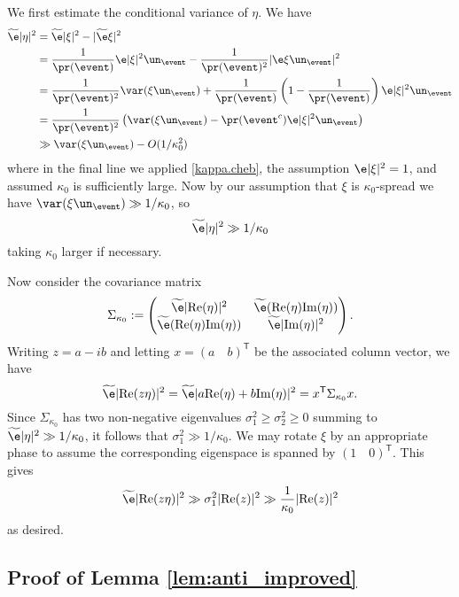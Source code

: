 \documentclass[aop,preprint]{imsart}
\theoremstyle{plain}
\theoremstyle{definition}
\theoremstyle{remark}
\numberwithin{equation}{section}
\numberwithin{theorem}{section}
\def \re {\mathrm{Re}}
\def \im {\mathrm{Im}}
\def \tran {\mathsf{T}}
\begin{document}
We first estimate the conditional variance of $\eta$. 
We have
\begin{align*}
\widetilde{\e}|\eta|^2 
& = \widetilde{\e}|\xi|^2 - |\widetilde{\e}\xi|^2 \\
&= \frac1{\pr(\event)} \e |\xi|^2 \un_{\event} - \frac1{\pr(\event)^2} |\e \xi \un_{\event}|^2\\
&= \frac1{\pr(\event)^2} \var(\xi\un_{\event}) + \frac1{\pr(\event)}\left(1-\frac1{\pr(\event)}\right) \e |\xi|^2\un_\event\\
&= \frac{1}{\pr(\event)^2} \left( \var(\xi\un_\event) - \pr(\event^c)\e |\xi|^2\un_{\event}\right)\\
&\gg \var(\xi\un_\event) - O(1/\kappa_0^2)
\end{align*}
where in the final line we applied \eqref{kappa.cheb}, the assumption $\e|\xi|^2=1$, and assumed $\kappa_0$ is sufficiently large. 
Now by our assumption that $\xi$ is $\kappa_0$-spread we have $\var(\xi\un_\event) \gg 1/\kappa_0$, so
\begin{equation}
\widetilde{\e}|\eta|^2  \gg 1/\kappa_0
\end{equation}
taking $\kappa_0$ larger if necessary.

Now consider the covariance matrix
\begin{equation}
\Sigma_{\kappa_0} := \begin{pmatrix} \widetilde{\e} |\re(\eta)|^2 & \widetilde{\e} (\re(\eta)\im(\eta))\\
\widetilde{\e} (\re(\eta)\im(\eta)) & \widetilde{\e} |\im(\eta)|^2 
\end{pmatrix}.
\end{equation}
Writing $z=a-ib$ and letting $x=(a\quad b)^\tran$ be the associated column vector, we have
\begin{equation}
\widetilde{\e}| \re(z\eta)|^2 = \widetilde{\e} |a\re(\eta) + b \im(\eta)|^2 = x^\tran \Sigma_{\kappa_0} x.
\end{equation}
Since $\Sigma_{\kappa_0}$ has two non-negative eigenvalues $\sigma^2_1\ge \sigma^2_2\ge 0$ summing to $\widetilde{\e}|\eta|^2  \gg 1/{\kappa_0}$, it follows that $\sigma_1^2 \gg 1/{\kappa_0}$.
We may rotate $\xi$ by an appropriate phase to assume the corresponding eigenspace is spanned by $(1\quad 0)^\tran$. 
This gives 
\[\widetilde{\e}| \re(z\eta)|^2 \gg \sigma_1^2 |\re(z)|^2 \gg \frac1{{\kappa_0}} |\re(z)|^2\] as desired.




\subsection{Proof of Lemma \ref{lem:anti_improved}}	\label{app:improved}
\end{document}
